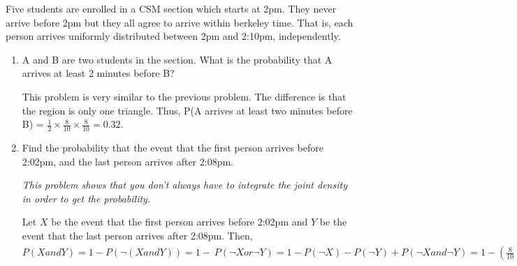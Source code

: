 \question Five students are enrolled in a CSM section which starts at 2pm. They never arrive before 2pm but they all agree to arrive within berkeley time. That is, each person arrives uniformly distributed between 2pm and 2:10pm, independently. 

\begin{enumerate}[label=(\alph*)] 
\item A and B are two students in the section. What is the probability that A arrives at least 2 minutes before B? 
\begin{solution}[4cm] 
This problem is very similar to the previous problem. The difference is that the region is only one triangle. Thus, P(A arrives at least two minutes before B) = $\frac{1}{2} \times \frac{8}{10} \times \frac{8}{10} = 0.32$. 
\end{solution}

\item Find the probability that the event that the first person arrives before 2:02pm, and the last person arrives after 2:08pm. 
\begin{solution}[4cm] 
\textit{This problem shows that you don't always have to integrate the joint density in order to get the probability.} 

Let $X$ be the event that the first person arrives before 2:02pm and $Y$ be the event that the last person arrives after 2:08pm. Then, \\ 
$P(X and Y) = 1 - P(\neg (X and Y)) = 1 - \ P(\neg X or \neg Y) = 1 - P(\neg X) - P(\neg Y) + P(\neg X and \neg Y) =  1 - (\frac{8}{10})^5 - (\frac{8}{10})^5+ {\frac{6}{10}}^5$ 

\end{solution}
\end{enumerate}